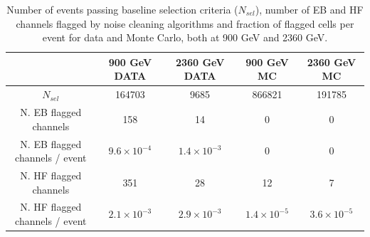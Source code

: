 \begin{table}[!ht]
  \begin{center}
    \begin{tabular}{|c|c|c|c|c|}
      \hline
                                   & 900 GeV DATA  & 2360 GeV DATA & 900 GeV MC & 2360 GeV MC \\
      \hline\hline
      $N_{sel}$                    & 164703           &     9685          &      866821         &      191785            \\
      \hline\hline
      N. EB flagged channels             & 158              & 14                 & 0                   & 0                      \\
      N. EB flagged channels / event     & $9.6 \times 10^{-4}$ & $1.4 \times 10^{-3}$ & 0                   & 0                      \\
      \hline\hline
      N. HF flagged channels             & 351              & 28                 & 12                  & 7                      \\
      N. HF flagged channels / event     & $2.1 \times 10^{-3}$ & $2.9 \times 10^{-3}$ & $1.4 \times 10^{-5}$  & $3.6 \times 10^{-5}$     \\
      \hline\hline
  \end{tabular}
    \caption{Number of events passing baseline selection criteria ($N_{sel}$), number of EB and HF channels flagged by noise cleaning algorithms 
and fraction of flagged cells per event for data and Monte Carlo, both at 900 GeV and 2360 GeV.}
    \label{tab:noiseCleaning}
  \end{center}
\end{table}





